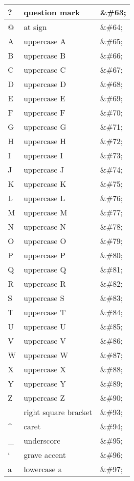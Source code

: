 \begin{longtable}{|l|l|l|}
\hline
?	&question mark		&\&\#63;\\
\hline
@	&at sign				&\&\#64;\\
\hline
A	&uppercase A			&\&\#65;\\
\hline
B	&uppercase B			&\&\#66;\\
\hline
C	&uppercase C			&\&\#67;\\
\hline
D	&uppercase D			&\&\#68;\\
\hline
E	&uppercase E			&\&\#69;\\
\hline
F	&uppercase F			&\&\#70;\\
\hline
G	&uppercase G			&\&\#71;\\
\hline
H	&uppercase H			&\&\#72;\\
\hline
I	&uppercase I			&\&\#73;\\
\hline
J	&uppercase J			&\&\#74;\\
\hline
K	&uppercase K			&\&\#75;\\
\hline
L	&uppercase L			&\&\#76;\\
\hline
M	&uppercase M			&\&\#77;\\
\hline
N	&uppercase N			&\&\#78;\\
\hline
O	&uppercase O			&\&\#79;\\
\hline
P	&uppercase P			&\&\#80;\\
\hline
Q	&uppercase Q			&\&\#81;\\
\hline
R	&uppercase R			&\&\#82;\\
\hline
S	&uppercase S			&\&\#83;\\
\hline
T	&uppercase T			&\&\#84;\\
\hline
U	&uppercase U			&\&\#85;\\
\hline
V	&uppercase V			&\&\#86;\\
\hline
W	&uppercase W		&\&\#87;\\
\hline
X	&uppercase X			&\&\#88;\\
\hline
Y	&uppercase Y			&\&\#89;\\
\hline
Z	&uppercase Z			&\&\#90;\\
\hline
[	&left square bracket	&\&\#91;\\
\hline
\	&backslash			&\&\#92;\\
\hline
]	&right square bracket	&\&\#93;\\
\hline
\^{}	&caret				&\&\#94;\\
\hline
\_	&underscore			&\&\#95;\\
\hline
`	&grave accent			&\&\#96;\\
\hline
a	&lowercase a			&\&\#97;\\

\end{longtable}
